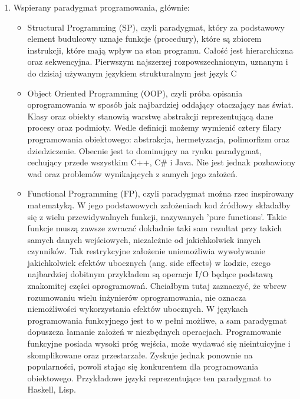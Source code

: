 \documentclass[skorowidz,skroty]{dyplomWEZUT}
\begin{document}
\begin{enumerate}
\item Wspierany paradygmat programowania, głównie:
\begin{itemize}
	\item Structural Programming (SP), czyli paradygmat, który za podstawowy element budulcowy uznaje funkcje (procedury), które są zbiorem instrukcji, które mają wpływ na stan programu. Całość jest hierarchiczna oraz sekwencyjna. Pierwszym najszerzej rozpowszechnionym, uznanym i do dzisiaj używanym językiem strukturalnym jest język C
	\item Object Oriented Programming (OOP), czyli próba opisania oprogramowania w sposób jak najbardziej oddający otaczający nas świat. Klasy oraz obiekty stanowią warstwę abstrakcji reprezentującą dane procesy oraz podmioty. Wedle definicji możemy wymienić cztery filary programowania obiektowego: abstrakcja, hermetyzacja, polimorfizm oraz dziedziczenie. Obecnie jest to dominujący na rynku paradygmat, cechujący przede wszystkim C++, C\# i Java. Nie jest jednak pozbawiony wad oraz problemów wynikających z samych jego założeń. 
	\item Functional Programming (FP), czyli paradygmat można rzec inspirowany matematyką. W jego podstawowych założeniach kod źródłowy składałby się z wielu przewidywalnych funkcji, nazywanych 'pure functions'. Takie funkcje muszą zawsze zwracać dokładnie taki sam rezultat przy takich samych danych wejściowych, niezależnie od jakichkolwiek innych czynników. Tak restrykcyjne założenie uniemożliwia wywoływanie jakichkolwiek efektów ubocznych (ang. side effects) w kodzie, czego najbardziej dobitnym przykładem są operacje I/O będące podstawą znakomitej części oprogramowań. Chciałbym tutaj zaznaczyć, że wbrew rozumowaniu wielu inżynierów oprogramowania, nie oznacza niemożliwości wykorzystania efektów ubocznych. W językach programowania funkcyjnego jest to w pełni możliwe, a sam paradygmat dopuszcza łamanie założeń w niezbędnych operacjach. Programowanie funkcyjne posiada wysoki próg wejścia, może wydawać się nieintuicyjne i skomplikowane oraz przestarzałe. Zyskuje jednak ponownie na popularności, powoli stając się konkurentem dla programowania obiektowego. Przykładowe języki reprezentujące ten paradygmat to Haskell, Lisp.
\end{itemize}  


\end{enumerate}
\end{document}
